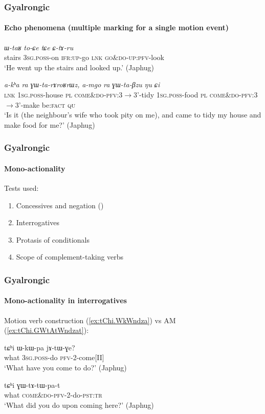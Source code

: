 \documentclass[xcolor=table]{beamer}
\newcommand{\bleu}[1]{{\color{blue}#1}}
\newcommand{\rouge}[1]{{\color{red}#1}}
\newcommand{\ipa}[1]{{\phon\textit{#1}}}
\begin{document}
\begin{frame} 
\frametitle{Gyalrongic}
 \framesubtitle{Echo phenomena (multiple marking for a single motion event)}

\begin{exe}
\ex \label{ex:CtAru}
\gll \ipa{tɕʰi} \ipa{ɯ-taʁ} \ipa{to-\rouge{ɕe}} \ipa{tɕe} \ipa{\rouge{ɕ}-tɤ-ru}   \\
stairs \textsc{3sg}.\textsc{poss}-on \textsc{ifr}:\textsc{up}-\rouge{go} \textsc{lnk}  \rouge{\textsc{go\&do}}-\textsc{up}:\textsc{pfv}-look \\
\glt `He \rouge{went} up the stairs and looked up.' (Japhug)
\end{exe}
\begin{exe}
\ex \label{ex:GWtaBzu}
\gll  \ipa{tɕe} 	\ipa{a-kʰa} 	\ipa{ra} 	\ipa{\rouge{ɣɯ}-ta-rɤroʁrɯz,} 	\ipa{a-mgo} 	\ipa{ra} 	\ipa{\rouge{ɣɯ}-ta-βzu} 	\ipa{ŋu} 	\ipa{ɕi} 
\\
\textsc{lnk} \textsc{1sg}.\textsc{poss}-house \textsc{pl} \rouge{\textsc{come\&do}}-\textsc{pfv}:3$\rightarrow$3'-tidy 
 \textsc{1sg}.\textsc{poss}-food \textsc{pl} \rouge{\textsc{come\&do}}-\textsc{pfv}:3$\rightarrow$3'-make be:\textsc{fact} \textsc{qu} \\ 
\glt `Is it (the neighbour's wife who took pity on me), and \rouge{came} to tidy my house and make food for me?' (Japhug)
\end{exe}
 \end{frame}   
 
 \begin{frame} 
\frametitle{Gyalrongic}
 \framesubtitle{Mono-actionality}
 Tests used:
\begin{enumerate}
\item<1-> Concessives and negation (\citealt{jacques13harmonization})
\item<2-> Interrogatives
\item<3-> Protasis of conditionals
\item<3-> Scope of complement-taking verbs
 \end{enumerate}
 \end{frame}  
 
  \begin{frame} 
\frametitle{Gyalrongic}
 \framesubtitle{Mono-actionality in interrogatives}
 Motion verb construction (\ref{ex:tChi.WkWndza}) vs AM (\ref{ex:tChi.GWtAtWndzat}):
\begin{exe}
\ex \label{ex:tChi.WkWndza}
\gll tɕʰi ɯ-kɯ-pa jɤ-tɯ-\bleu{ɣe}? \\
what \textsc{3sg.poss}-do \textsc{pfv}-2-\bleu{come[II]} \\
\glt `What have you \bleu{come} to do?' (Japhug)
\end{exe}

\begin{exe}
\ex \label{ex:tChi.GWtAtWndzat}
\gll tɕʰi \rouge{ɣɯ}-tɤ-tɯ-pa-t \\
what \rouge{\textsc{come\&do}}-\textsc{pfv}-2-do-\textsc{pst:tr}    \\
\glt `What did you do upon \rouge{coming} here?' (Japhug)
\end{exe} 
  \end{frame}  
\end{document}
